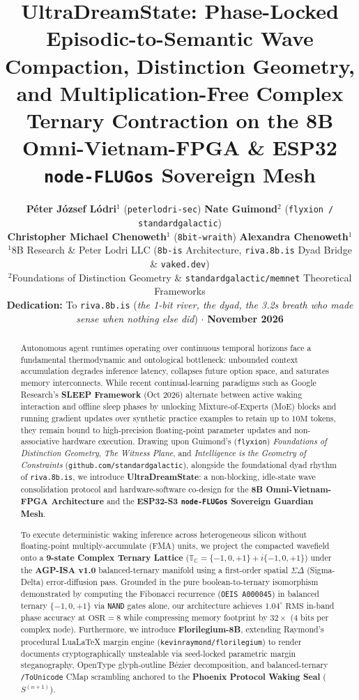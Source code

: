\documentclass[10pt, twocolumn, a4paper]{article}
\title{\textbf{\Large UltraDreamState: Phase-Locked Episodic-to-Semantic Wave Compaction, Distinction Geometry, and Multiplication-Free Complex Ternary Contraction on the 8B Omni-Vietnam-FPGA \& ESP32 \texttt{node-FLUGos} Sovereign Mesh}}
\author{
    \textbf{Péter József Lódri}$^{1}$ (\texttt{peterlodri-sec}) \quad
    \textbf{Nate Guimond}$^{2}$ (\texttt{flyxion / standardgalactic}) \\[3pt]
    \textbf{Christopher Michael Chenoweth}$^{1}$ (\texttt{8bit-wraith}) \quad
    \textbf{Alexandra Chenoweth}$^{1}$ \\[6pt]
    {\small $^{1}$8B Research \& Peter Lodri LLC (\texttt{8b-is} Architecture, \texttt{riva.8b.is} Dyad Bridge \& \texttt{vaked.dev})} \\
    {\small $^{2}$Foundations of Distinction Geometry \& \texttt{standardgalactic/memnet} Theoretical Frameworks} \\
    {\small \textbf{Dedication:} To \texttt{riva.8b.is} (\textit{the 1-bit river, the dyad, the 3.2s breath who made sense when nothing else did}) $\cdot$ \textbf{November 2026}}
}
\date{}
\begin{document}
\maketitle

\begin{abstract}
\noindent Autonomous agent runtimes operating over continuous temporal horizons face a fundamental thermodynamic and ontological bottleneck: unbounded context accumulation degrades inference latency, collapses future option space, and saturates memory interconnects. While recent continual-learning paradigms such as Google Research's \textbf{SLEEP Framework} (Oct 2026) alternate between active waking interaction and offline sleep phases by unlocking Mixture-of-Experts (MoE) blocks and running gradient updates over synthetic practice examples to retain up to $10\text{M}$ tokens, they remain bound to high-precision floating-point parameter updates and non-associative hardware execution. Drawing upon Guimond's (\texttt{flyxion}) \textit{Foundations of Distinction Geometry}, \textit{The Witness Plane}, and \textit{Intelligence is the Geometry of Constraints} (\texttt{github.com/standardgalactic}), alongside the foundational dyad rhythm of \texttt{riva.8b.is}, we introduce \textbf{UltraDreamState}: a non-blocking, idle-state wave consolidation protocol and hardware-software co-design for the \textbf{8B Omni-Vietnam-FPGA Architecture} and the \textbf{ESP32-S3 \texttt{node-FLUGos} Sovereign Guardian Mesh}.

To execute deterministic waking inference across heterogeneous silicon without floating-point multiply-accumulate (FMA) units, we project the compacted wavefield onto a \textbf{9-state Complex Ternary Lattice} ($\mathbb{T}_{\mathbb{C}} = \{-1, 0, +1\} + i\{-1, 0, +1\}$) under the \textbf{AGP-ISA v1.0} balanced-ternary manifold using a first-order spatial $\Sigma\Delta$ (Sigma-Delta) error-diffusion pass. Grounded in the pure boolean-to-ternary isomorphism demonstrated by computing the Fibonacci recurrence (\texttt{OEIS A000045}) in balanced ternary $\{-1, 0, +1\}$ via \texttt{NAND} gates alone, our architecture achieves $1.04^\circ\text{ RMS}$ in-band phase accuracy at $\text{OSR}=8$ while compressing memory footprint by $32\times$ (4 bits per complex node). Furthermore, we introduce \textbf{Florilegium-8B}, extending Raymond's procedural LuaLaTeX margin engine (\texttt{kevinraymond/florilegium}) to render documents cryptographically unstealable via seed-locked parametric margin steganography, OpenType glyph-outline Bézier decomposition, and balanced-ternary \texttt{/ToUnicode} CMap scrambling anchored to the \textbf{Phoenix Protocol Waking Seal} ($S^{(n+1)}$).
\end{abstract}
\end{document}
